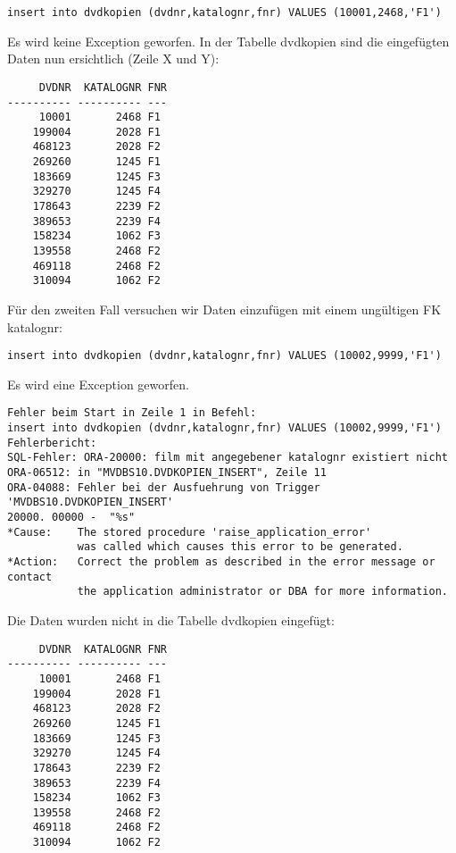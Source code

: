 \documentclass[11pt,a4paper,parskip=half]{scrartcl}
\begin{document}
\begin{lstlisting}
insert into dvdkopien (dvdnr,katalognr,fnr) VALUES (10001,2468,'F1')
\end{lstlisting}

Es wird keine Exception geworfen. In der Tabelle dvdkopien sind die eingefügten Daten nun ersichtlich (Zeile X und Y):

\begin{lstlisting}
     DVDNR  KATALOGNR FNR
---------- ---------- ---
     10001       2468 F1  
    199004       2028 F1  
    468123       2028 F2  
    269260       1245 F1  
    183669       1245 F3  
    329270       1245 F4  
    178643       2239 F2  
    389653       2239 F4  
    158234       1062 F3  
    139558       2468 F2  
    469118       2468 F2  
    310094       1062 F2  
\end{lstlisting}

Für den zweiten Fall versuchen wir Daten einzufügen mit einem ungültigen FK katalognr:

\begin{lstlisting}
insert into dvdkopien (dvdnr,katalognr,fnr) VALUES (10002,9999,'F1')
\end{lstlisting}

Es wird eine Exception geworfen.

\begin{lstlisting}
Fehler beim Start in Zeile 1 in Befehl:
insert into dvdkopien (dvdnr,katalognr,fnr) VALUES (10002,9999,'F1')
Fehlerbericht:
SQL-Fehler: ORA-20000: film mit angegebener katalognr existiert nicht
ORA-06512: in "MVDBS10.DVDKOPIEN_INSERT", Zeile 11
ORA-04088: Fehler bei der Ausfuehrung von Trigger 'MVDBS10.DVDKOPIEN_INSERT'
20000. 00000 -  "%s"
*Cause:    The stored procedure 'raise_application_error'
           was called which causes this error to be generated.
*Action:   Correct the problem as described in the error message or contact
           the application administrator or DBA for more information.
\end{lstlisting}

Die Daten wurden nicht in die Tabelle dvdkopien eingefügt:

\begin{lstlisting}
     DVDNR  KATALOGNR FNR
---------- ---------- ---
     10001       2468 F1  
    199004       2028 F1  
    468123       2028 F2  
    269260       1245 F1  
    183669       1245 F3  
    329270       1245 F4  
    178643       2239 F2  
    389653       2239 F4  
    158234       1062 F3  
    139558       2468 F2  
    469118       2468 F2  
    310094       1062 F2  
\end{lstlisting}
\end{document}
